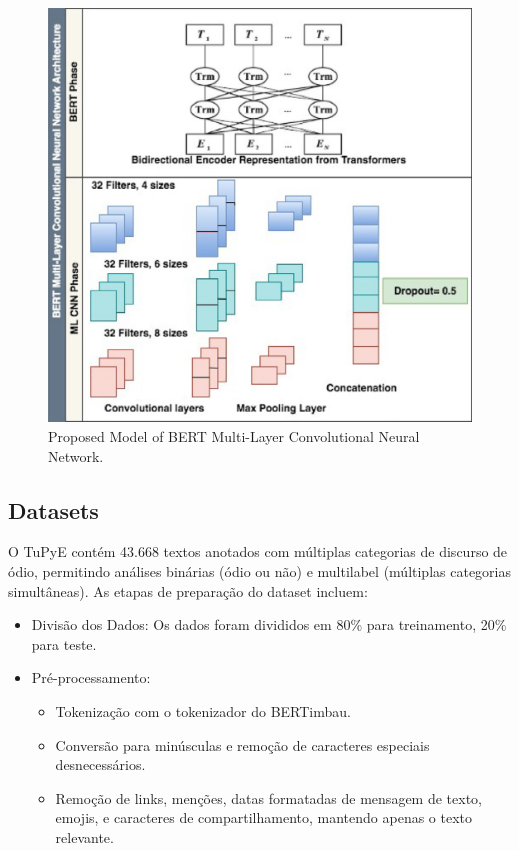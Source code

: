\documentclass[sigconf,nonacm]{acmart}
\begin{document}
\begin{figure}[H]
  \centering
  \includegraphics[width=\linewidth]{./resources/bertcnn_architecture.png}
  \caption{Proposed Model of BERT Multi-Layer Convolutional Neural Network. \cite{ATANDOH2023101578}}
  \label{fig:bertcnn_architecture}
\end{figure}


\subsection{Datasets}
O TuPyE contém 43.668 textos anotados com múltiplas categorias de discurso de ódio, permitindo análises binárias (ódio ou não) e multilabel 
(múltiplas categorias simultâneas). As etapas de preparação do dataset incluem:

\begin{itemize}
  \item Divisão dos Dados: Os dados foram divididos em 80\% para treinamento, 20\% para teste.
  \item Pré-processamento:
  \begin{itemize}
    \item Tokenização com o tokenizador do BERTimbau.
    \item Conversão para minúsculas e remoção de caracteres especiais desnecessários.
    \item Remoção de links, menções, datas formatadas de mensagem de texto, emojis, e caracteres de compartilhamento, mantendo apenas o texto relevante.
  \end{itemize}
\end{itemize}
\end{document}

